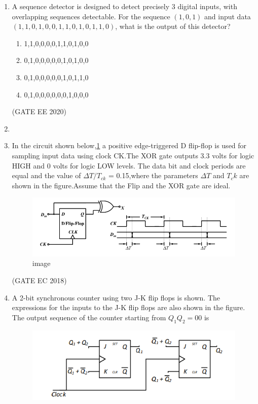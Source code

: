\begin{enumerate}
\item A sequence detector is designed to detect precisely 3 digital inputs, with overlapping sequences detectable. For the sequence $(1,0,1)$ and input data $(1,1,0,1,0,0,1,1,0,1,0,1,1,0)$, what is the output of this detector?
		\begin{enumerate}
			\item 1,1,0,0,0,0,1,1,0,1,0,0
			\item 0,1,0,0,0,0,0,1,0,1,0,0
			\item 0,1,0,0,0,0,0,1,0,1,1,0
			\item 0,1,0,0,0,0,0,0,1,0,0,0
		\end{enumerate}
		\hfill (GATE EE 2020)
\item 


\item In the circuit shown below,\ref{fig:image} a positive edge-triggered D flip-flop is used for sampling input data
 using clock CK.The XOR gate outputs 3.3 volts for logic HIGH and 0 volts for logic LOW levels.
The data bit and clock periods are equal and the value of $ \Delta T / T_{ck} $ = 0.15,where
the parameters $ \Delta T $ and $ T_ck$ are shown in the figure.Assume  that the Flip and
the XOR gate are ideal.  
\begin{figure}[!ht] 
    \includegraphics[scale=0.4]{figs/image.png} 
    \caption{image}
    \label{fig:image}
 \end{figure}
\label{fig:2018-gate-ec-46}
\hfill(GATE EC 2018)
\item A 2-bit synchronous counter using two J-K flip flops is shown. The expressions for the inputs to the J-K flip flops are also shown in the figure. The output sequence of the counter starting from $Q_1Q_2 = 00$ is 
\begin{figure}[!ht]
	\centering
	\includegraphics[width=\columnwidth]{figs/question44.png}

\end{figure}
\end{enumerate}
